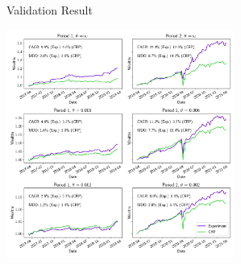 \begin{frame}{Validation Result}
\begin{center}
\includegraphics[height= 7.5cm]{images/crp_compare.png}
\end{center}

\end{frame}
